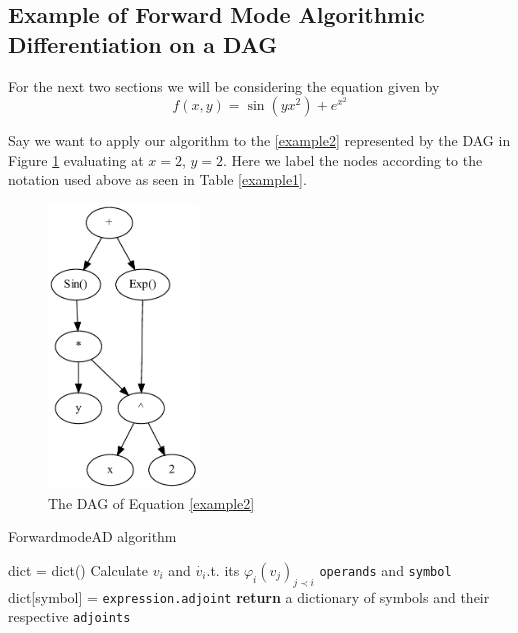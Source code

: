 \documentclass{article}
\begin{document}
\subsection{Example of Forward Mode Algorithmic Differentiation on a DAG}

For the next two sections we will be considering the equation given by
\begin{equation}
    \label{example2}
    f(x,y) = \sin(yx^2) + e^{x^2}
\end{equation}

Say we want to apply our algorithm to the \ref{example2} represented by the DAG in Figure \ref{fig:DAGgraph} evaluating at $x=2$, $y=2$. Here we label the nodes according to the notation used above as seen in Table \ref{example1}. 




\begin{figure}[h!]
    \includegraphics[width=4cm]{images/Graph_DAGExample.pdf}
    \caption{The DAG of Equation \ref{example2}}
    \label{fig:DAGgraph}
\end{figure}



\begin{algorithm}[h]
\caption{ForwardmodeAD algorithm}\label{forwardAD}
\begin{algorithmic}[1]
\State dict = dict()\Comment{}
    \State Calculate $v_i$ and $\Dot{v_i}$.t. its $\varphi_i(v_j)_{j \prec i}$ \verb|operands| and \verb|symbol|
    \State dict[symbol] = \verb|expression.adjoint|
    \EndFor
\EndFor
\State \textbf{return} a dictionary of symbols and their respective \verb|adjoints|
\EndProcedure
\end{algorithmic}
\end{algorithm}
\end{document}
